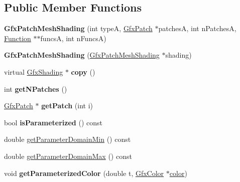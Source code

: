 \subsection*{Public Member Functions}
\begin{DoxyCompactItemize}
\item 
\mbox{\label{class_gfx_patch_mesh_shading_adbfd9d157a5083ddbe178f241c86b997}} 
{\bfseries Gfx\+Patch\+Mesh\+Shading} (int typeA, \hyperlink{struct_gfx_patch}{Gfx\+Patch} $\ast$patchesA, int n\+PatchesA, \hyperlink{class_function}{Function} $\ast$$\ast$funcsA, int n\+FuncsA)
\item 
\mbox{\label{class_gfx_patch_mesh_shading_ab59a4d76dc0dadfe3f550c286e658197}} 
{\bfseries Gfx\+Patch\+Mesh\+Shading} (\hyperlink{class_gfx_patch_mesh_shading}{Gfx\+Patch\+Mesh\+Shading} $\ast$shading)
\item 
\mbox{\label{class_gfx_patch_mesh_shading_a85486350859fa6db7dd3ac3909e2f9e2}} 
virtual \hyperlink{class_gfx_shading}{Gfx\+Shading} $\ast$ {\bfseries copy} ()
\item 
\mbox{\label{class_gfx_patch_mesh_shading_ac62f377b0bf627863886fb2e6c2c49ac}} 
int {\bfseries get\+N\+Patches} ()
\item 
\mbox{\label{class_gfx_patch_mesh_shading_a5a38952d2969ac9701986336a45d1be7}} 
\hyperlink{struct_gfx_patch}{Gfx\+Patch} $\ast$ {\bfseries get\+Patch} (int i)
\item 
\mbox{\label{class_gfx_patch_mesh_shading_af441158aea3ab56f47165b9d54d2b646}} 
bool {\bfseries is\+Parameterized} () const
\item 
double \hyperlink{class_gfx_patch_mesh_shading_a9dfc69bcc0118dd37cb237634031b856}{get\+Parameter\+Domain\+Min} () const
\item 
double \hyperlink{class_gfx_patch_mesh_shading_ac03f7da2444d285f27708d1db5dc2299}{get\+Parameter\+Domain\+Max} () const
\item 
\mbox{\label{class_gfx_patch_mesh_shading_ad435548888f77734a7246da4ae101c7c}} 
void {\bfseries get\+Parameterized\+Color} (double t, \hyperlink{struct_gfx_color}{Gfx\+Color} $\ast$\hyperlink{structcolor}{color})
\end{DoxyCompactItemize}
